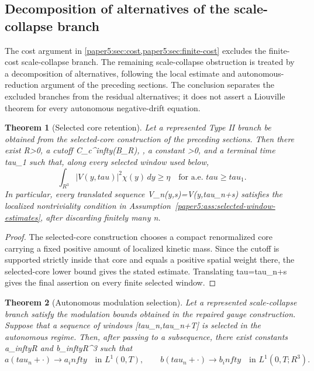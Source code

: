 \documentclass[11pt]{amsart}
\def\({}%
\def\){}%
\def\mathbb#1{#1}%
\def\tau{tau}%
\def\infty{infty}%
\theoremstyle{plain}
\newtheorem{theorem}{Theorem}[section]
\theoremstyle{definition}
\theoremstyle{remark}
\begin{document}
\subsection{Decomposition of alternatives of the scale-collapse branch}
\label{paper5:sec:branch-closure}

The cost argument in \cref{paper5:sec:cost,paper5:sec:finite-cost} excludes the finite-cost scale-collapse branch.  The remaining
scale-collapse obstruction is treated by a decomposition of alternatives, following the local
estimate and autonomous-reduction argument of the preceding sections.  The conclusion separates the excluded branches from the residual alternatives; it does not assert a Liouville theorem for every autonomous negative-drift equation.

\begin{theorem}[Selected core retention]\label{paper5:thm:core-retention}
Let a represented Type II branch be obtained from the selected-core construction of the preceding sections.  Then there exist \(R>0\), a cutoff \(\chi\in C_c^\infty(B_R)\), \(\chi{}\), a
constant \(\eta>0\), and a terminal time \(\tau_1\) such that, along every selected window used
below,
\[
  \int_{\mathbb R^3}|V(y,\tau)|^2\chi(y)\,dy\ge\eta
  \quad\text{for a.e. }\tau\ge\tau_1.
\]
In particular, every translated sequence \(V_n(y,s)=V(y,\tau_n+s)\) satisfies the localized
nontriviality condition in Assumption~\ref{paper5:ass:selected-window-estimates}, after discarding
finitely many \(n\).
\end{theorem}

\begin{proof}
The selected-core construction chooses a compact renormalized core carrying a fixed positive
amount of localized kinetic mass.  Since the cutoff \(\chi\) is supported strictly inside that
core and equals a positive spatial weight there, the selected-core lower bound gives the stated
estimate.  Translating \(\tau=\tau_n+s\) gives the final assertion on every finite selected
window.
\end{proof}

\begin{theorem}[Autonomous modulation selection]\label{paper5:thm:autonomous-modulation-selection}
Let a represented scale-collapse branch satisfy the modulation bounds obtained in the repaired
gauge construction.  Suppose that a sequence of windows \([\tau_n,\tau_n+T]\) is selected in the
autonomous regime.  Then, after passing to a subsequence, there exist constants
\(a_\infty\in\mathbb R\) and \(b_\infty\in\mathbb R^3\) such that
\[
  a(\tau_n+\cdot)\to a_\infty
  \quad\text{in }L^1(0,T),
  \qquad
  b(\tau_n+\cdot)\to b_\infty
  \quad\text{in }L^1(0,T;\mathbb R^3).
\]
\end{theorem}
\end{document}
